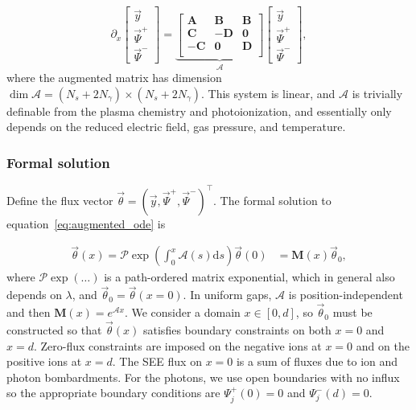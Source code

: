 \documentclass{iopjournal}
\newcommand{\diff}{\ensuremath{\text{d}}}
\begin{document}
\begin{equation}
  \label{eq:augmented_ode}
  \partial_x
  \begin{bmatrix}
    \vec{y} \\ \vec{\Psi}^+ \\ \vec{\Psi}^-
  \end{bmatrix}
  =
  \underbrace{
  \begin{bmatrix}
    \bm{A} & \bm{B} & \bm{B} \\
    \bm{C} & -\bm{D} & \bm{0} \\
    -\bm{C} & \bm{0} & \bm{D} \\
  \end{bmatrix}
  }_{\bm{\mathcal{A}}}
  \begin{bmatrix}
    \vec{y} \\ \vec{\Psi}^+ \\ \vec{\Psi}^-
  \end{bmatrix},
\end{equation}
where the augmented matrix has dimension $\dim \bm{\mathcal{A}} = (N_s+2N_\gamma)\times(N_s+2N_\gamma)$.
This system is linear, and $\bm{\mathcal{A}}$ is trivially definable from the plasma chemistry and photoionization, and essentially only depends on the reduced electric field, gas pressure, and temperature.

\subsubsection{Formal solution}
Define the flux vector $\vec{\theta} = \left(\vec{y}, \vec{\Psi}^+,\vec{\Psi}^-\right)^\intercal$.
The formal solution to equation~\eqref{eq:augmented_ode} is

\begin{equation}
  \label{eq:theta_soln}
  \begin{split}
    \vec{\theta}(x) = \mathcal{P}\exp\left(\int_0^x \bm{\mathcal{A}}(s)\diff s\right)\vec{\theta}(0)
    &= \bm{M}(x)\vec{\theta}_0,
  \end{split}
\end{equation}
where $\mathcal{P}\exp\left(\ldots \right)$ is a path-ordered matrix exponential, which in general also depends on $\lambda$, and $\vec{\theta}_0 = \vec{\theta}(x=0)$.
In uniform gaps, $\bm{\mathcal{A}}$ is position-independent and then $\bm{M}(x) = e^{\bm{\mathcal{A}}x}$.
We consider a domain $x\in[0,d]$, so $\vec{\theta}_0$ must be constructed so that $\vec{\theta}(x)$ satisfies boundary constraints on both $x=0$ and $x=d$.
Zero-flux constraints are imposed on the negative ions at $x=0$ and on the positive ions at $x=d$.
The SEE flux on $x=0$ is a sum of fluxes due to ion and photon bombardments.
For the photons, we use open boundaries with no influx so the appropriate boundary conditions are $\Psi_j^+(0) = 0$ and $\Psi_j^-(d) = 0$.
\end{document}
